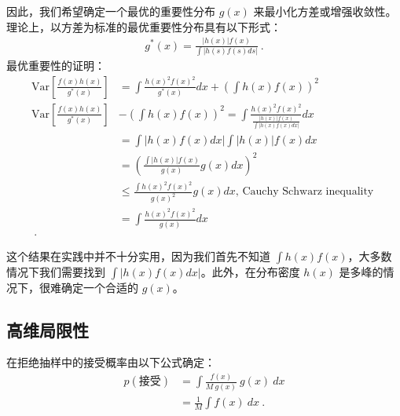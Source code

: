因此，我们希望确定一个最优的重要性分布 \(g(x)\) 来最小化方差或增强收敛性。理论上，以方差为标准的最优重要性分布具有以下形式：
\begin{align}
    g^{*}(x)=\frac{|h(x)|f(x)}{\int|h(s)f(s)d s|}~.
\end{align}
最优重要性的证明：
\begin{align}
\text{Var}\left[\frac{f(x)h(x)}{g^{*}(x)}\right]&=\int\frac{h(x)^{2}f(x)^{2}}{g^{*}(x)}d x+\left(\int h(x) f(x)\right)^{2} \\ 
\text{Var}\left[\frac{f(x)h(x)}{g^{*}(x)}\right]&-\left(\int h(x) f(x)\right)^{2}=\int\frac{h(x)^{2}f(x)^{2}}{\frac{|h(x)|f(x)}{\int|h(x)f(x)dx|}}d x \\
    &=\int|h(x)f(x)d x|\int|h(x)|f(x)d x\\
    &=\left(\frac{\int|h(x)|f(x)}{g(x)}  g(x) d x\right)^2\\
    &\leq \frac{\int h(x)^2f(x)^2}{g(x)^2}  g(x) d x \text{, Cauchy Schwarz inequality }\\
    &=\int\frac{h(x)^{2}f(x)^{2}}{g(x)}d x\\~.
\end{align}

这个结果在实践中并不十分实用，因为我们首先不知道 $\int h(x) f(x)$，大多数情况下我们需要找到 $\int|h(x)f(x)dx|$。此外，在分布密度 $h(x)$ 是多峰的情况下，很难确定一个合适的 $g(x)$。

\subsection{高维局限性}
在拒绝抽样中的接受概率由以下公式确定：
\begin{align}   
    p(\text{接受}) &=  \int\frac{f(x)}{M \ g(x)} \ g(x) \ d x \\
    &=\frac{1}{M}\int f(x) \ d x~.
\end{align}
